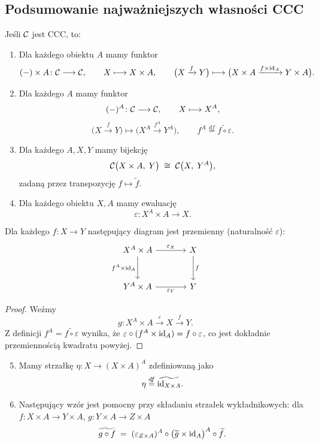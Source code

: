 \subsection*{Podsumowanie najważniejszych własności CCC}

Jeśli $\mathcal{C}$ jest CCC, to:

\begin{enumerate}
\item Dla każdego obiektu $A$ mamy funktor
\[
(-)\times A \colon \mathcal{C} \longrightarrow \mathcal{C}, \qquad X \longmapsto X\times A, \qquad \bigl(X \xrightarrow{f} Y\bigr) \longmapsto \bigl(X\times A \xrightarrow{f\times \mathrm{id}_A} Y\times A\bigr).
\]

\item Dla każdego $A$ mamy funktor
\[
(-)^{A} \colon \mathcal{C} \longrightarrow \mathcal{C}, \qquad X \longmapsto X^{A},
\]
\[
\bigl(X \xrightarrow{f} Y\bigr) \longmapsto \bigl(X^{A} \xrightarrow{f^{A}} Y^{A}\bigr), \qquad f^{A} \stackrel{df}{=} \widetilde{f\circ \varepsilon}.
\]

\item Dla każdego $A,X,Y$ mamy bijekcję
\[
\mathcal{C}\bigl(X\times A,\; Y\bigr) \;\cong\; \mathcal{C}\bigl(X,\; Y^{A}\bigr),
\]
zadaną przez transpozycję $f \mapsto \tilde{f}$.

\item Dla każdego obiektu $X,A$ mamy ewaluację
\[
\varepsilon \colon X^{A}\times A \longrightarrow X.
\]
\end{enumerate}

\begin{stwierdzenie}
Dla każdego $f\colon X\to Y$ następujący diagram jest przemienny (naturalność $\varepsilon$):
\[
\begin{tikzcd}[column sep=large, row sep=large]
X^{A}\times A \arrow[r, "\varepsilon_{X}"] \arrow[d, "f^{A}\times \id_{A}"'] & X \arrow[d, "f"] \\
Y^{A}\times A \arrow[r, "\varepsilon_{Y}"'] & Y
\end{tikzcd}
\]
\end{stwierdzenie}

\begin{proof}
Weźmy
\[
g \colon X^{A}\times A \xrightarrow{\varepsilon} X \xrightarrow{f} Y.
\]
Z definicji $f^A = \widetilde{f\circ\varepsilon}$ wynika, że $\varepsilon\circ(f^A\times\mathrm{id}_A) = f\circ\varepsilon$, co jest dokładnie przemiennością kwadratu powyżej.
\end{proof}

\begin{enumerate}
\setcounter{enumi}{4}
\item Mamy strzałkę $\eta\colon X \to (X\times A)^{A}$ zdefiniowaną jako
\[
\eta \stackrel{df}{=} \widetilde{\mathrm{id}_{X\times A}}.
\]

\item Następujący wzór jest pomocny przy składaniu strzałek wykładnikowych: dla $f\colon X\times A\to Y\times A$, $g\colon Y\times A\to Z\times A$
\[
\widetilde{g\circ f} \;=\; (\varepsilon_{Z\times A})^{A}\circ \bigl(\widetilde{g}\times\mathrm{id}_{A}\bigr)^{A}\circ \widetilde{f}.
\]
\end{enumerate}

